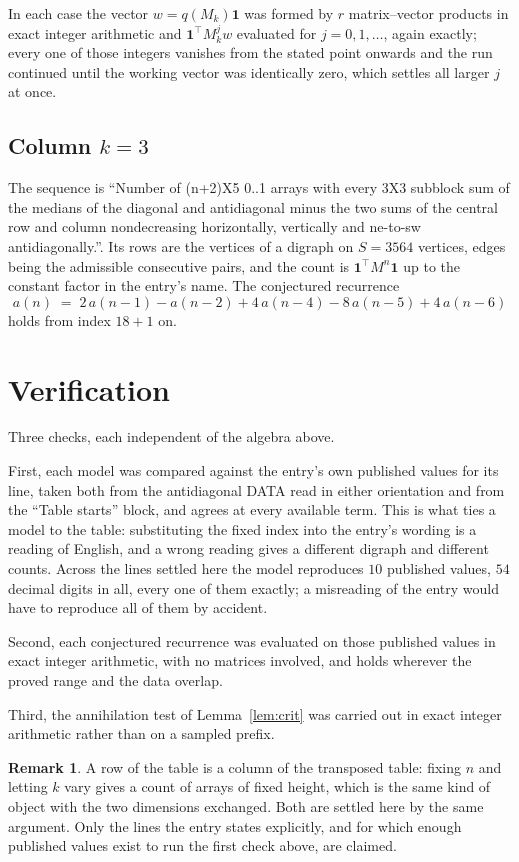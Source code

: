 \documentclass[11pt,a4paper]{article}
\theoremstyle{plain}
\theoremstyle{definition}
\newtheorem{remark}[theorem]{Remark}
\begin{document}
In each case the vector $w=q(M_k)\mathbf{1}$ was formed by $r$ matrix--vector products in
exact integer arithmetic and $\mathbf{1}^{\!\top}M_k^{j}w$ evaluated for $j=0,1,\dots$,
again exactly; every one of those integers vanishes from the stated point onwards and the run
continued until the working vector was identically zero, which settles all larger $j$ at once.

\subsection*{Column $k$$=3$}
The sequence is ``Number of (n+2)X5 0..1 arrays with every 3X3 subblock sum of the medians of the diagonal and antidiagonal minus the two sums of the central row and column nondecreasing horizontally, vertically and ne-to-sw antidiagonally.''. Its rows are the vertices of a digraph on
$S=3564$ vertices, edges being the admissible consecutive pairs, and the count is
$\mathbf{1}^{\!\top}M^{n}\mathbf{1}$ up to the constant factor in the entry's name.
The conjectured recurrence
\[
a(n)\;=\;2\,a(n-1) - a(n-2) + 4\,a(n-4) - 8\,a(n-5) + 4\,a(n-6)
\]
holds from index $18+1$ on.

\section{Verification}

Three checks, each independent of the algebra above.

First, each model was compared against the entry's own published values for its line, taken
both from the antidiagonal DATA read in either orientation and from the ``Table starts''
block, and agrees at every available term. This is what ties a model to the table:
substituting the fixed index into the entry's wording is a reading of English, and a wrong
reading gives a different digraph and different counts. Across the lines settled here the
model reproduces $10$ published values, $54$ decimal digits in all, every one of
them exactly; a misreading of the entry would have to reproduce all of them by accident.

Second, each conjectured recurrence was evaluated on those published values in exact
integer arithmetic, with no matrices involved, and holds wherever the proved range and the
data overlap.

Third, the annihilation test of Lemma~\ref{lem:crit} was carried out in exact integer
arithmetic rather than on a sampled prefix.

\begin{remark}
A row of the table is a column of the transposed table: fixing $n$ and letting $k$ vary gives a
count of arrays of fixed height, which is the same kind of object with the two dimensions
exchanged. Both are settled here by the same argument. Only the lines the entry states
explicitly, and for which enough published values exist to run the first check above, are
claimed.
\end{remark}
\end{document}
